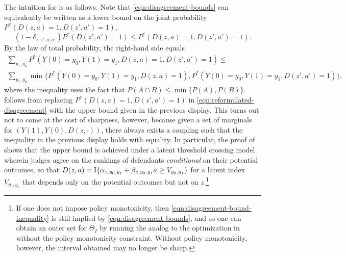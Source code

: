 \documentclass[12pt]{article}%
\theoremstyle{definition}
\newcommand\1{\operatorname{I}\indicatorfence}
\begin{document}
The intuition for  is as follows. Note that \cref{eqn:disagreement-bounds} can equivalently be written as a lower bound on the joint probability $P^*(D(z, a) = 1, D(z', a') = 1)$,
\begin{equation}
 (1-\delta_{z, z', a, a'}) P^*(D(z', a')=1)\leq P^*(D(z, a) = 1, D(z', a') = 1). \label{eqn:reformulated-disagreement}
\end{equation}
By the law of total probability, the right-hand side equals
\begin{multline*}
 \sum_{y_1,y_0} P^*(Y(0)=y_0,Y(1) = y_1, D(z, a) = 1, D(z', a') = 1)\leq \\
 \sum_{y_1,y_0} \min\{P^*(Y(0)=y_0, Y(1) = y_1, D(z, a) = 1), P^*(Y(0)=y_0,Y(1) = y_1, D(z', a') = 1) \},
\end{multline*}
where the inequality uses the fact that $P(A \cap B) \leq \min\{ P(A), P(B) \}$.  follows from replacing
$P^*(D(z, a) = 1, D(z', a') = 1)$ in \eqref{eqn:reformulated-disagreement} with the upper bound given in the previous
display. This turns out not to come at the cost of sharpness, however, because
given a set of marginals for $(Y(1), Y(0), D(z, \cdot))$, there always
exists a coupling such that the inequality in the previous display holds with
equality. In particular, the proof of
 shows that the upper bound is
achieved under a latent threshold crossing model wherein judges agree on the
rankings of defendants \emph{conditional} on their potential outcomes, so that
$D(z, a) = \1{\alpha_{z, y_0, y_1} + \beta_{z, y_0, y_1} a \geq V_{y_0, y_{1}}}$ for
a latent index $V_{y_0, y_1}$ that depends only on the potential outcomes but not
on $z$.\footnote{If one does not impose policy monotonicity, then \eqref{eqn:disagreement-bound-inequality} is still implied by \eqref{eqn:disagreement-bounds}, and so one can obtain an outer set for $\Theta_I$ by running the analog to the optimization in  without the policy monotonicity constraint. Without policy monotonicity, however, the interval obtained may no longer be sharp.}
\end{document}
